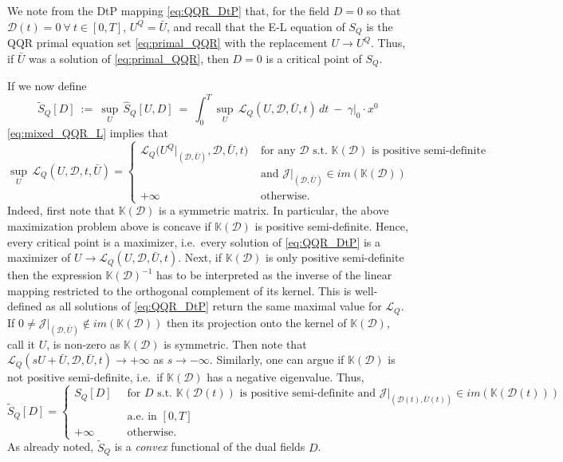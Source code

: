 \documentclass[11pt]{article}
\newcommand{\K}{\mathbb{K}}
\newcommand{\dee}{\mathcal{D}}
\newcommand{\scl}{\mathcal{L}}
\begin{document}
We note from the DtP mapping \eqref{eq:QQR_DtP} that, for the field $D = 0$ so that $\dee(t) = 0 \ \forall \ t \in [0,T]$, $U^Q = \bar{U}$, and recall that the E-L equation of $S_Q$ is the QQR primal equation set \eqref{eq:primal_QQR} with the replacement $U \to U^Q$. Thus, if $\bar{U}$ was a solution of \eqref{eq:primal_QQR}, then $D=0$ is a critical point of $S_Q$.

If we now define
\begin{equation} \label{eq: def tildeS}
\tilde{S}_Q[D] \ := \ \sup_{U} \, \widehat{S}_Q [U,D] \ = \ \int_0^T \sup_{U} \, \scl_Q (U, \dee, \bar{U}, t) \, dt \ - \ \gamma|_0 \cdot x^0
\end{equation}
\eqref{eq:mixed_QQR_L} implies that
\begin{equation*}
\sup_{U} \, \scl_Q (U, \dee, t, \bar{U}) = \begin{cases} \scl_Q \Big(U^Q|_{(\dee,\bar{U})},\dee, \bar{U}, t \Big) &\mbox{ for any } \dee  \text{ s.t. }  \K(\dee)  \text{ is positive semi-definite} \\ &\text{ and } \mathcal{J}|_{(\dee,\bar{U})} \in im(\K(\dee))\\
+ \infty  &\text{ otherwise}.
\end{cases}
\end{equation*}
Indeed, first note that $\K(\dee)$ is a symmetric matrix. In particular, the above maximization problem above is concave if $\K(\dee)$ is positive semi-definite. Hence, every critical point is a maximizer, i.e.~every solution of \eqref{eq:QQR_DtP} is a maximizer of $U \to \mathcal{L}_Q(U,\dee,\bar{U},t)$. Next, if $\K(\dee)$ is only positive semi-definite then the expression $\K(\dee)^{-1}$ has to be interpreted as the inverse of the linear mapping restricted to the orthogonal complement of its kernel. This is well-defined as all solutions of \eqref{eq:QQR_DtP} return the same maximal value for $\scl_Q$. If $0\neq \mathcal{J}|_{(\dee,\bar{U})} \notin im(\K(\dee))$ then its projection onto the kernel of $\K(\dee)$, call it $U$, is non-zero as $\K(\dee)$ is symmetric. Then note that $\mathcal{L}_Q(sU + \bar{U},\dee,\bar{U},t) \rightarrow +\infty$ as $s \to -\infty$. Similarly, one can argue if $\K(\dee)$ is not positive semi-definite, i.e.~if $\K(\dee)$ has a negative eigenvalue. Thus,
\begin{equation}\label{eq: tildeSQ}
\tilde{S}_Q [D] = \begin{cases} S_Q [D] \ &\mbox{ for } D \mbox{ s.t. } \K(\dee(t)) \mbox{ is positive semi-definite and $\mathcal{J}|_{(\dee(t),\bar{U}(t))} \in im(\K(\dee(t)))$} \\ &\text{ a.e.~in } [0,T] \\
+ \infty &\mbox{ otherwise}.
\end{cases}
\end{equation}
As already noted, $\tilde{S}_Q$ is a \emph{convex} functional of the dual fields $D$.
\end{document}
